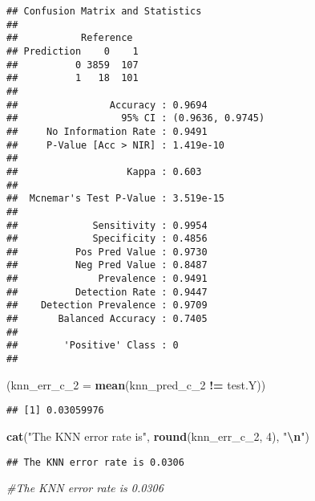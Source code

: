 \documentclass[
]{article}
\newenvironment{Shaded}{\begin{snugshade}}{\end{snugshade}}
\newcommand{\AttributeTok}[1]{\textcolor[rgb]{0.13,0.29,0.53}{#1}}
\newcommand{\CommentTok}[1]{\textcolor[rgb]{0.56,0.35,0.01}{\textit{#1}}}
\newcommand{\DecValTok}[1]{\textcolor[rgb]{0.00,0.00,0.81}{#1}}
\newcommand{\FunctionTok}[1]{\textcolor[rgb]{0.13,0.29,0.53}{\textbf{#1}}}
\newcommand{\NormalTok}[1]{#1}
\newcommand{\SpecialCharTok}[1]{\textcolor[rgb]{0.81,0.36,0.00}{\textbf{#1}}}
\newcommand{\StringTok}[1]{\textcolor[rgb]{0.31,0.60,0.02}{#1}}
\begin{document}
\begin{verbatim}
## Confusion Matrix and Statistics
## 
##           Reference
## Prediction    0    1
##          0 3859  107
##          1   18  101
##                                           
##                Accuracy : 0.9694          
##                  95% CI : (0.9636, 0.9745)
##     No Information Rate : 0.9491          
##     P-Value [Acc > NIR] : 1.419e-10       
##                                           
##                   Kappa : 0.603           
##                                           
##  Mcnemar's Test P-Value : 3.519e-15       
##                                           
##             Sensitivity : 0.9954          
##             Specificity : 0.4856          
##          Pos Pred Value : 0.9730          
##          Neg Pred Value : 0.8487          
##              Prevalence : 0.9491          
##          Detection Rate : 0.9447          
##    Detection Prevalence : 0.9709          
##       Balanced Accuracy : 0.7405          
##                                           
##        'Positive' Class : 0               
## 
\end{verbatim}

\begin{Shaded}
\begin{Highlighting}[]
\NormalTok{(}\AttributeTok{knn\_err\_c\_2 =} \FunctionTok{mean}\NormalTok{(knn\_pred\_c\_2 }\SpecialCharTok{!=}\NormalTok{ test.Y))}
\end{Highlighting}
\end{Shaded}

\begin{verbatim}
## [1] 0.03059976
\end{verbatim}

\begin{Shaded}
\begin{Highlighting}[]
\FunctionTok{cat}\NormalTok{(}\StringTok{"The KNN error rate is"}\NormalTok{, }\FunctionTok{round}\NormalTok{(knn\_err\_c\_2, }\DecValTok{4}\NormalTok{), }\StringTok{"}\SpecialCharTok{\textbackslash{}n}\StringTok{"}\NormalTok{)}
\end{Highlighting}
\end{Shaded}

\begin{verbatim}
## The KNN error rate is 0.0306
\end{verbatim}

\begin{Shaded}
\begin{Highlighting}[]
\CommentTok{\#The KNN error rate is 0.0306 }
\end{Highlighting}
\end{Shaded}
\end{document}
